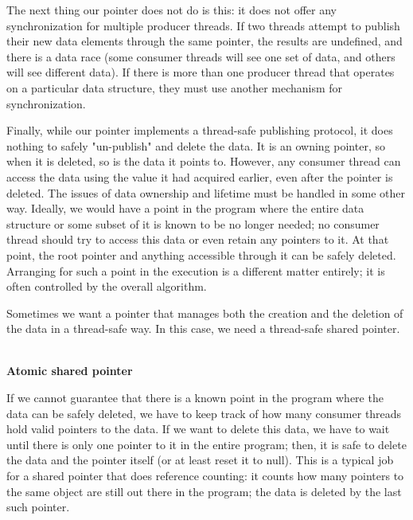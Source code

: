 The next thing our pointer does not do is this: it does not offer any synchronization for multiple producer threads. If two threads attempt to publish their new data elements through the same pointer, the results are undefined, and there is a data race (some consumer threads will see one set of data, and others will see different data). If there is more than one producer thread that operates on a particular data structure, they must use another mechanism for synchronization.

Finally, while our pointer implements a thread-safe publishing protocol, it does nothing to safely "un-publish" and delete the data. It is an owning pointer, so when it is deleted, so is the data it points to. However, any consumer thread can access the data using the value it had acquired earlier, even after the pointer is deleted. The issues of data ownership and lifetime must be handled in some other way. Ideally, we would have a point in the program where the entire data structure or some subset of it is known to be no longer needed; no consumer thread should try to access this data or even retain any pointers to it. At that point, the root pointer and anything accessible through it can be safely deleted. Arranging for such a point in the execution is a different matter entirely; it is often controlled by the overall algorithm.

Sometimes we want a pointer that manages both the creation and the deletion of the data in a thread-safe way. In this case, we need a thread-safe shared pointer.

\hspace*{\fill} \\ %
\noindent
\textbf{Atomic shared pointer}

If we cannot guarantee that there is a known point in the program where the data can be safely deleted, we have to keep track of how many consumer threads hold valid pointers to the data. If we want to delete this data, we have to wait until there is only one pointer to it in the entire program; then, it is safe to delete the data and the pointer itself (or at least reset it to null). This is a typical job for a shared pointer that does reference counting: it counts how many pointers to the same object are still out there in the program; the data is deleted by the last such pointer.

